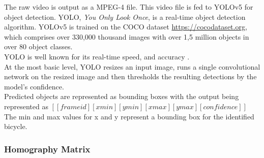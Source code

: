 The raw video is output as a MPEG-4 file. This video file is fed to YOLOv5 for object detection. YOLO, \textit{You Only Look Once},
is a real-time object detection algorithm. YOLOv5 is trained on the COCO dataset \url{https://cocodataset.org}, which comprises over 330,000 thousand images
with over 1,5 million objects in over 80 object classes.
\ \\ 
YOLO is well known for its real-time speed, and accuracy \cite{redmon2016look}.
\ \\ 
At the most basic level, YOLO resizes an input image, runs a single convolutional network on the resized image
and then thresholds the resulting detections by the model’s confidence.
\ \\ 
Predicted objects are represented as bounding boxes with the output being represented as $[[frame id][xmin][ymin][xmax][ymax][confidence]]$
\ \\
The min and max values for x and y represent a bounding box for the identified bicycle.

\subsubsection{Homography Matrix}

